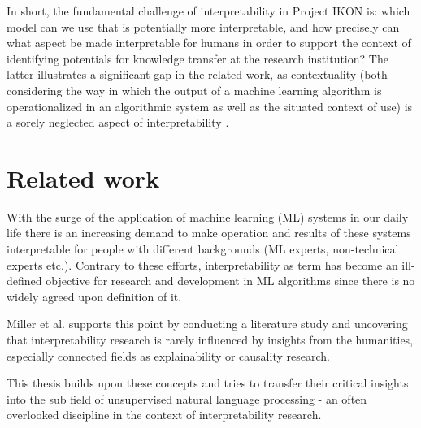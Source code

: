 \documentclass[pdftex,a4paper,12pt]{scrartcl}
\begin{document}
In short, the fundamental challenge of interpretability in Project IKON is: which model can we use that is potentially more interpretable, and how precisely can what aspect be made interpretable for humans in order to support the context of identifying potentials for knowledge transfer at the research institution? The latter illustrates a significant gap in the related work, as contextuality (both considering the way in which the output of a machine learning algorithm is operationalized in an algorithmic system as well as the situated context of use) is a sorely neglected aspect of interpretability \cite{millerExplanationArtificialIntelligence2017}.

\section{Related work}

With the surge of the application of machine learning (ML) systems in our daily life there is an increasing demand to make operation and results of these systems interpretable for people with different backgrounds (ML experts, non-technical experts etc.). Contrary to these efforts, interpretability as term has become an ill-defined objective \cite{liptonMythosModelInterpretability2016}  for research and development in ML algorithms since there is no widely agreed upon definition of it. 

Miller et al. \cite{millerExplainableAIBeware2017} supports this point by conducting a literature study and uncovering that interpretability research is rarely influenced by insights from the humanities, especially connected fields as explainability or causality research.

This thesis builds upon these concepts  and tries to transfer their critical insights into the sub field of unsupervised natural language processing - an often overlooked discipline in the context of interpretability research.
\end{document}
